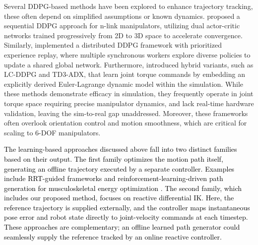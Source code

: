 \documentclass[preprint,12pt]{elsarticle}
\begin{document}
Several DDPG-based methods have been explored to enhance trajectory tracking, these often depend on simplified assumptions or known dynamics. \cite{majumder2024enhancing} proposed a sequential DDPG approach for n-link manipulators, utilizing dual actor-critic networks trained progressively from 2D to 3D space to accelerate convergence. Similarly, \cite{zhang2019trajectory} implemented a distributed DDPG framework with prioritized experience replay, where multiple synchronous workers explore diverse policies to update a shared global network. Furthermore, \cite{hazem2025reinforcement} introduced hybrid variants, such as LC-DDPG and TD3-ADX, that learn joint torque commands by embedding an explicitly derived Euler-Lagrange dynamic model within the simulation. While these methods demonstrate efficacy in simulation, they frequently operate in joint torque space requiring precise manipulator dynamics, and lack real-time hardware validation, leaving the sim-to-real gap unaddressed. Moreover, these frameworks often overlook orientation control and motion smoothness, which are critical for scaling to 6-DOF manipulators.


\textcolor{black}{The learning-based approaches discussed above fall into two distinct families based on their output. The first family optimizes the motion path itself, generating an offline trajectory executed by a separate controller. Examples include RRT-guided frameworks \cite{ota, li2021general} and reinforcement-learning-driven path generation for musculoskeletal energy optimization \cite{khan2025reinforcement}. The second family, which includes our proposed method, focuses on reactive differential IK. Here, the reference trajectory is supplied externally, and the controller maps instantaneous pose error and robot state directly to joint-velocity commands at each timestep. These approaches are complementary; an offline learned path generator could seamlessly supply the reference tracked by an online reactive controller.}
\end{document}
